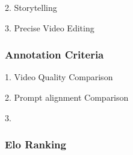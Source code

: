 2. Storytelling

3. Precise Video Editing

\subsubsection{Annotation Criteria}
1. Video Quality Comparison

2. Prompt alignment Comparison

3.




\subsubsection{Elo Ranking}














